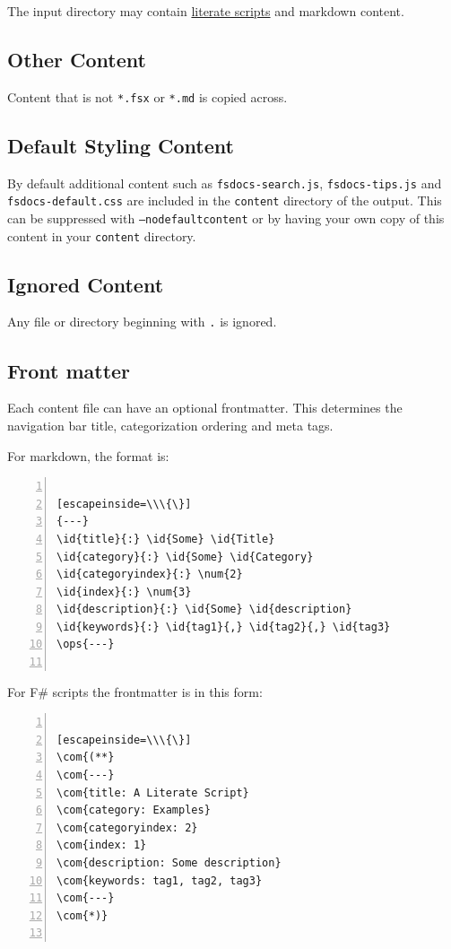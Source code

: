 \documentclass{article}
\newcommand{\id}[1]{\textcolor{black}{#1}}
\newcommand{\com}[1]{\textcolor{officegreen}{#1}}
\newcommand{\num}[1]{\textcolor{officegreen}{#1}}
\newcommand{\ops}[1]{\textcolor{purple}{#1}}
\begin{document}
The input directory may contain \href{literate.html}{literate scripts} and markdown content.
\subsection*{Other Content}



Content that is not \texttt{*.fsx} or \texttt{*.md} is copied across.
\subsection*{Default Styling Content}



By default additional content such as \texttt{fsdocs-search.js}, \texttt{fsdocs-tips.js} and \texttt{fsdocs-default.css} are included in
the \texttt{content} directory of the output.  This can be suppressed with \texttt{--nodefaultcontent} or by having your own
copy of this content in your \texttt{content} directory.
\subsection*{Ignored Content}



Any file or directory beginning with \texttt{.} is ignored.
\subsection*{Front matter}



Each content file can have an optional frontmatter.  This determines the navigation bar title, categorization ordering and meta tags.


For markdown, the format is:
\begin{lstlisting}[numbers=left]

[escapeinside=\\\{\}]
{---}
\id{title}{:} \id{Some} \id{Title}
\id{category}{:} \id{Some} \id{Category}
\id{categoryindex}{:} \num{2}
\id{index}{:} \num{3}
\id{description}{:} \id{Some} \id{description}
\id{keywords}{:} \id{tag1}{,} \id{tag2}{,} \id{tag3}
\ops{---}


\end{lstlisting}



For F\# scripts the frontmatter is in this form:
\begin{lstlisting}[numbers=left]

[escapeinside=\\\{\}]
\com{(**}
\com{---}
\com{title: A Literate Script}
\com{category: Examples}
\com{categoryindex: 2}
\com{index: 1}
\com{description: Some description}
\com{keywords: tag1, tag2, tag3}
\com{---}
\com{*)}


\end{lstlisting}
\end{document}
